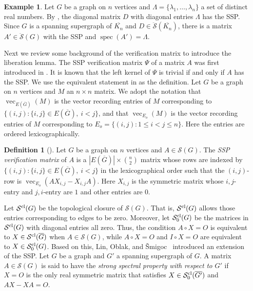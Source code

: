 \documentclass{article}
\theoremstyle{definition}
\newtheorem{definition}[theorem]{Definition}
\newtheorem{example}[theorem]{Example}
\newcommand{\spec}{\operatorname{spec}}
\newcommand{\mptn}{\mathcal{S}}
\newcommand{\mptncl}{\mathcal{S}^{\rm cl}}
\newcommand{\mptnclo}{\mathcal{S}^{\rm cl}_0}
\newcommand{\mdso}{\ddot{\mathcal{S}}}
\newcommand{\mvec}{\operatorname{vec}}
\begin{document}
\begin{example}
\label{ex:discrete}
Let $G$ be a graph on $n$ vertices and $\Lambda = \{\lambda_1, \ldots, \lambda_n\}$ a set of distinct real numbers.  By \cite[Theorem~34]{gSAP}, the diagonal matrix $D$ with diagonal entries $\Lambda$ has the SSP.  Since $G$ is a spanning supergraph of $\overline{K_n}$ and $D \in \mdso(\overline{K_n})$, there is a matrix $A'\in\mdso(G)$ with the SSP and $\spec(A') = \Lambda$. 
\end{example}

Next we review some background of the verification matrix to introduce the liberation lemma.  The SSP verification matrix $\Psi$ of a matrix $A$ was first introduced in \cite{IEPG2}.  It is known that the left kernel of $\Psi$ is trivial if and only if $A$ has the SSP.  We use the equivalent statement in \cite[Proposition~7.7]{IEPG2} as the definition.  Let $G$ be a graph on $n$ vertices and $M$ an $n\times n$ matrix.  We adopt the notation that $\mvec_{E(\overline{G})}(M)$ is the vector recording entries of $M$ corresponding to $\{(i,j): \{i,j\}\in E(\overline{G}),\ i < j\}$, and that $\mvec_{E_o}(M)$ is the vector recording entries of $M$ corresponding to $E_o = \{(i,j): 1\leq i < j \leq n\}$.  Here the entries are ordered lexicographically.

\begin{definition}[\cite{IEPG2}]
Let $G$ be a graph on $n$ vertices and $A\in\mptn(G)$.  The \emph{SSP verification matrix} of $A$ is a $|E(\overline{G})|\times \binom{n}{2}$ matrix whose rows are indexed by $\{(i,j): \{i,j\}\in E(\overline{G}),\ i < j\}$ in the lexicographical order such that the $(i,j)$-row is $\mvec_{E_o}(AX_{i,j} - X_{i,j}A)$.  Here $X_{i,j}$ is the symmetric matrix whose $i,j$-entry and $j,i$-entry are $1$ and other entries are $0$.
\end{definition}

Let $\mptncl(G)$ be the topological closure of $\mptn(G)$.  That is, $\mptncl(G)$ allows those entries corresponding to edges to be zero.  Moreover, let $\mptnclo(G)$ be the matrices in $\mptncl(G)$ with diagonal entries all zero.  Thus, the condition $A\circ X = O$ is equivalent to $X\in\mptncl(\overline{G})$ when $A\in\mptn(G)$, while $A\circ X = O$ and $I\circ X = O$ are equivalent to $X\in\mptnclo(G)$.  Based on this, Lin, Oblak, and Šmigoc~\cite{LiberationG} introduced an extension of the SSP. 
Let $G$ be a graph and $G'$ a spanning supergraph of $G$.  A matrix $A\in\mptn(G)$ is said to have the \emph{strong spectral property with respect to $G'$} if $X = O$ is the only real symmetric matrix that satisfies $X\in\mptnclo(\overline{G'})$ and $AX - XA = O$.  
\end{document}
